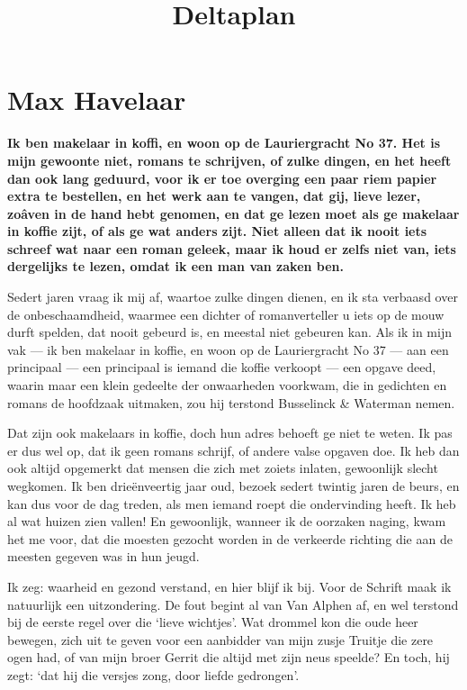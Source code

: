 \documentclass[DIV=calc]{scrbook}
\title{Deltaplan}
\newcommand{\introduction}[1]{\large \textbf{#1}}
\begin{document}
\chapter{Max Havelaar}

\introduction{Ik ben makelaar in koffi, en woon op de Lauriergracht No 37. Het is mijn gewoonte niet, romans te schrijven, of zulke dingen, en het heeft dan ook lang geduurd, voor ik er toe overging een paar riem papier extra te bestellen, en het werk aan te vangen, dat gij, lieve lezer, zoâven in de hand hebt genomen, en dat ge lezen moet als ge makelaar in koffie zijt, of als ge wat anders zijt. Niet alleen dat ik nooit iets schreef wat naar een roman geleek, maar ik houd er zelfs niet van, iets dergelijks te lezen, omdat ik een man van zaken ben.}

Sedert jaren vraag ik mij af, waartoe zulke dingen dienen, en ik sta verbaasd over de onbeschaamdheid, waarmee een dichter of romanverteller u iets op de mouw durft spelden, dat nooit gebeurd is, en meestal niet gebeuren kan. Als ik in mijn vak --- ik ben makelaar in koffie, en woon op de Lauriergracht No 37 --- aan een principaal --- een principaal is iemand die koffie verkoopt --- een opgave deed, waarin maar een klein gedeelte der onwaarheden voorkwam, die in gedichten en romans de hoofdzaak uitmaken, zou hij terstond Busselinck \& Waterman nemen.

Dat zijn ook makelaars in koffie, doch hun adres behoeft ge niet te weten. Ik pas er dus wel op, dat ik geen romans schrijf, of andere valse opgaven doe. Ik heb dan ook altijd opgemerkt dat mensen die zich met zoiets inlaten, gewoonlijk slecht wegkomen. Ik ben drieënveertig jaar oud, bezoek sedert twintig jaren de beurs, en kan dus voor de dag treden, als men iemand roept die ondervinding heeft. Ik heb al wat huizen zien vallen! En gewoonlijk, wanneer ik de oorzaken naging, kwam het me voor, dat die moesten gezocht worden in de verkeerde richting die aan de meesten gegeven was in hun jeugd.

Ik zeg: waarheid en gezond verstand, en hier blijf ik bij. Voor de Schrift maak ik natuurlijk een uitzondering. De fout begint al van Van Alphen af, en wel terstond bij de eerste regel over die `lieve wichtjes'. Wat drommel kon die oude heer bewegen, zich uit te geven voor een aanbidder van mijn zusje Truitje die zere ogen had, of van mijn broer Gerrit die altijd met zijn neus speelde? En toch, hij zegt: `dat hij die versjes zong, door liefde gedrongen'.

\end{document}
